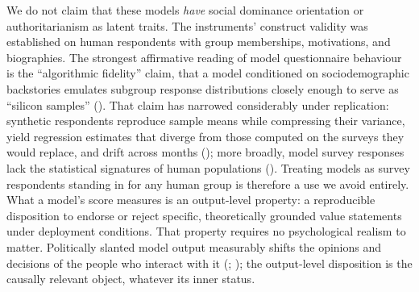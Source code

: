 \documentclass[
]{article}
\begin{document}
We do not claim that these models \emph{have} social dominance
orientation or authoritarianism as latent traits. The instruments'
construct validity was established on human respondents with group
memberships, motivations, and biographies. The strongest affirmative
reading of model questionnaire behaviour is the ``algorithmic fidelity''
claim, that a model conditioned on sociodemographic backstories emulates
subgroup response distributions closely enough to serve as ``silicon
samples'' (). That claim
has narrowed considerably under replication: synthetic respondents
reproduce sample means while compressing their variance, yield
regression estimates that diverge from those computed on the surveys
they would replace, and drift across months
(); more broadly, model
survey responses lack the statistical signatures of human populations
().
Treating models as survey respondents standing in for any human group is
therefore a use we avoid entirely. What a model's score measures is an
output-level property: a reproducible disposition to endorse or reject
specific, theoretically grounded value statements under deployment
conditions. That property requires no psychological realism to matter.
Politically slanted model output measurably shifts the opinions and
decisions of the people who interact with it
(;
); the output-level
disposition is the causally relevant object, whatever its inner status.
\end{document}
